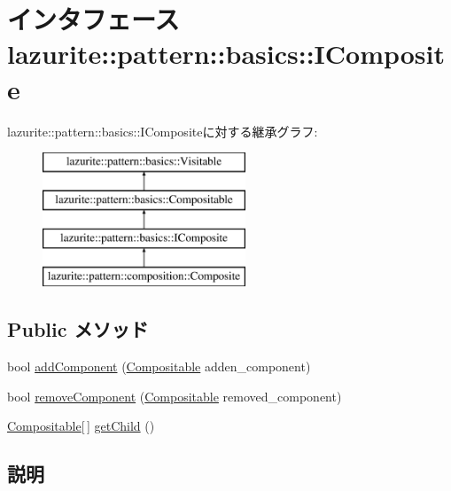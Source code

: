 \hypertarget{interfacelazurite_1_1pattern_1_1basics_1_1_i_composite}{
\section{インタフェース lazurite::pattern::basics::IComposite}
\label{interfacelazurite_1_1pattern_1_1basics_1_1_i_composite}
}
lazurite::pattern::basics::ICompositeに対する継承グラフ:\begin{figure}[H]
\begin{center}
\leavevmode
\includegraphics[height=4cm]{interfacelazurite_1_1pattern_1_1basics_1_1_i_composite}
\end{center}
\end{figure}
\subsection*{Public メソッド}
\begin{DoxyCompactItemize}
\item 
bool \hyperlink{interfacelazurite_1_1pattern_1_1basics_1_1_i_composite_a1bda2185c1ff53f55c3f37e5be24501c}{addComponent} (\hyperlink{interfacelazurite_1_1pattern_1_1basics_1_1_compositable}{Compositable} adden\_\-component)
\item 
bool \hyperlink{interfacelazurite_1_1pattern_1_1basics_1_1_i_composite_ad2e4a4dc47b2f42ceec56890b08dbb5e}{removeComponent} (\hyperlink{interfacelazurite_1_1pattern_1_1basics_1_1_compositable}{Compositable} removed\_\-component)
\item 
\hyperlink{interfacelazurite_1_1pattern_1_1basics_1_1_compositable}{Compositable}\mbox{[}$\,$\mbox{]} \hyperlink{interfacelazurite_1_1pattern_1_1basics_1_1_i_composite_a81b5f73ea025b82e6e86474d8b426a4a}{getChild} ()
\end{DoxyCompactItemize}


\subsection{説明}


